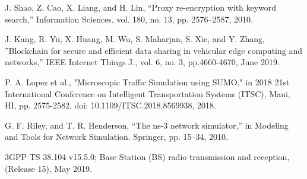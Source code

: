 \documentclass[journal,10pt]{IEEEtran}
\begin{document}
\begin{thebibliography}{1}
J. Shao, Z. Cao, X. Liang, and H. Lin, “Proxy re-encryption with keyword search,” Information Sciences, vol. 180, no. 13, pp. 2576–2587, 2010.

J. Kang, R. Yu, X. Huang, M. Wu, S. Maharjan, S. Xie, and Y. Zhang, ”Blockchain for secure and efficient data sharing in vehicular edge computing and networks,” IEEE Internet Things J., vol. 6, no. 3, pp.4660-4670, June 2019.

P. A. Lopez et al., "Microscopic Traffic Simulation using SUMO," in 2018 21st International Conference on Intelligent Transportation Systems (ITSC), Maui, HI, pp. 2575-2582, doi: 10.1109/ITSC.2018.8569938, 2018.

G. F. Riley, and T. R. Henderson, “The ns-3 network simulator,” in Modeling and Tools for Network Simulation. Springer, pp. 15–34, 2010.

3GPP TS 38.104 v15.5.0; Base Station (BS) radio transmission and reception, (Release 15), May 2019.






\end{thebibliography}
\end{document}
